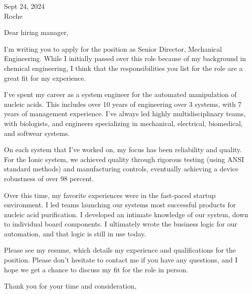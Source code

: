\documentclass[a4paper, 10pt]{letter}
\begin{document}
\begin{letter}
{
    Sept 24, 2024\\
    Roche\\
}

\opening{Dear hiring manager,}

I'm writing you to apply for the position as Senior Director, Mechanical Engineering. While I initially passed over this role because of my background in chemical engineering, I think that the responsibilities you list for the role are a great fit for my experience. 

I've spent my career as a system engineer for the automated manipulation of nucleic acids. This includes over 10 years of engineering over 3 systems, with 7 years of management experience. I've always led highly multidisciplinary teams, with biologists, and engineers specializing in mechanical, electrical, biomedical, and softwear systems. 

On each system that I've worked on, my focus has been reliability and quality. For the Ionic system, we achieved quality through rigorous testing (using ANSI standard methods) and manufacturing controls, eventually achieving a device robustness of over 98 percent.

Over this time, my favorite experiences were in the fast-paced startup environment.  I led teams launching our systems most successful products for nucleic acid purification. I developed an intimate knowledge of our system, down to individual board components. I ultimately wrote the business logic for our automation, and that logic is still in use today. 

Please see my resume, which details my experience and qualifications for the position. Please don't hesitate to contact me if you have any questions, and I hope we 
get a chance to discuss my fit for the role in person. 

\closing{Thank you for your time and consideration,}

\end{letter}
\end{document}
